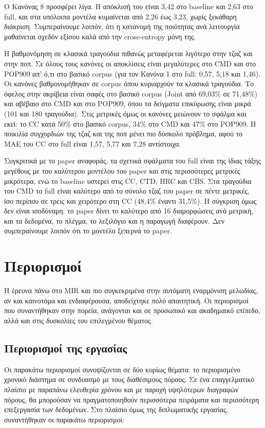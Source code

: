 Ο Κανόνας 8 προσφέρει λίγα. Η απόκλισή του είναι 3,42 στο baseline και 2,63 στο full, και στα υπόλοιπα μοντέλα κυμαίνεται από 2,26 έως 3,23, χωρίς ξεκάθαρη διάκριση. Συμπεραίνουμε λοιπόν, ότι η κατανομή της ποιότητας ανά λειτουργία μαθαίνεται σχεδόν εξίσου καλά από την cross-entropy μόνη της.

Η βαθμονόμηση σε κλασικά τραγούδια πιθανώς μεταφέρεται λιγότερο στην τζαζ και στην ποπ. Σε όλους τους κανόνες οι αποκλίσεις είναι μεγαλύτερες στο CMD και στο POP909 απ' ό,τι στο βασικό corpus (για τον Κανόνα 1 στο full: 0,57, 5,18 και 1,46). Οι κανόνες βαθμονομήθηκαν σε corpus όπου κυριαρχούν τα κλασικά τραγούδια. Το όφελος στην ακρίβεια είναι σαφές στο βασικό corpus (Joint από 69,03\% σε 71,48\%) και αβέβαιο στο CMD και στο POP909, όπου τα δείγματα επικύρωσης είναι μικρά (101 και 180 τραγούδια). Στις μετρικές όμως οι κανόνες μειώνουν το σφάλμα και εκεί: το CC κατά 50\% στο βασικό corpus, 34\% στο CMD και 47\% στο POP909. Η ποικιλία συγχορδιών της τζαζ και της ποπ μένει πιο δύσκολο πρόβλημα, αφού το MAE του CC στο full είναι 1,57, 5,77 και 7,28 αντίστοιχα.

Συγκριτικά με το paper αναφοράς, τα σχετικά σφάλματα του full είναι της ίδιας τάξης μεγέθους με του καλύτερου μοντέλου του paper και στις περισσότερες μετρικές μικρότερα, ενώ το baseline υστερεί στις CC, CTD, HRC και CBS. Στα τραγούδια του CMD το full είναι καλύτερο από το σύνολο τζαζ του paper σε πέντε μετρικές, ίσο περίπου σε τρεις και χειρότερο στη CC (48,4\% έναντι 31,5\%). Η σύγκριση όμως δεν είναι ισοδύναμη: το paper δίνει το καλύτερο από 16 διαμορφώσεις ανά μετρική, και τα δεδομένα, το πλέγμα, το λεξιλόγιο και η παραγωγή διαφέρουν. Δεν συμπεραίνουμε λοιπόν ότι το μοντέλο ξεπερνά το paper.

\section{Περιορισμοί}
Η έρευνα πάνω στο MIR και πιο συγκεκριμένα στην αυτόματη εναρμόνιση μελωδίας, αν και καινοτόμα και ενδιαφέρουσα, αποδείχτηκε πολύ απαιτητική. Οι περιορισμοί που συναντήθηκαν στην πορεία, ανάγονται και σε προσωπικό και ακαδημαικό επίπεδο, αλλά και στις δυσκολίες του επιλεγμένου θέματος.

\subsection{Περιορισμοί της εργασίας}
Οι παρακάτω περιορισμοί συνοψίζονται σε δύο κυρίως θέματα: το περιορισμένο χρονικό διάστημα σε συνδυασμό με τους διαθέσιμους πόρους. Σε ένα επαγγελματικό πλαίσιο με παραπάνω ελευθερία χρόνου και με παροχή υψηλότερων διαγραφών πόρους, θα μπορούσαν να πραγματοποιηθούν περισσότερα πειράματα και περισσότερη επεξεργασία των δεδομένων. Στο πλαίσιο όμως της διπλωματικής εργασίας, συναντήθηκαν οι παρακάτω περιορισμοί:

